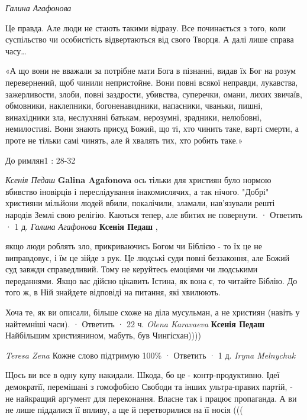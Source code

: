 \begin{itemize}
\emph{Галина Агафонова}

Це правда. Але люди не стають такими відразу. Все починається з того, коли
суспільство чи особистість відвертаються від свого Творця. А далі лише справа
часу…

«А що вони не вважали за потрібне мати Бога в пізнанні, видав їх Бог на розум
перевернений, щоб чинили непристойне. Вони повні всякої неправди, лукавства,
зажерливости, злоби, повні заздрости, убивства, суперечки, омани, лихих
звичаїв, обмовники, наклепники, богоненавидники, напасники, чваньки, пишні,
винахідники зла, неслухняні батькам, нерозумні, зрадники, нелюбовні,
немилостиві. Вони знають присуд Божий, що ті, хто чинить таке, варті смерти, а
проте не тільки самі чинять, але й хвалять тих, хто робить таке.»

До римлян1 : 28-32

\begin{itemize}
\emph{Ксенія Педаш}
\textbf{Galina Agafonova} ось тільки для християн було нормою вбивство
іновірців і переслідування інакомислячих, а так нічого. "Добрі" християни
мільйони людей вбили, покалічили, зламали, нав'язували решті народів Землі свою
релігію. Каються тепер, але вбитих не повернути.
 · Ответить · 1 д.
\emph{Галина Агафонова}
\textbf{Ксенія Педаш} , 

якщо люди роблять зло, прикриваючись Богом чи Біблією - то їх це не
виправдовує, і їм це зійде з рук. Це людські суди повні беззаконня, але Божий
суд завжди справедливий. Тому не керуйтесь емоціями чи людськими переданнями.
Якщо вас дійсно цікавить Істина, як вона є, то читайте Біблію. До того ж, в Ній
знайдете відповіді на питання, які хвилюють.

Хоча те, як ви описали, більше схоже на діла мусульман, а не християн (навіть у найтемніші часи).
 · Ответить · 22 ч.
\emph{Olena Karavaeva}
\textbf{Ксенія Педаш} Найбільшим християнином, мабуть, був Чингісхан))))
\end{itemize}

\emph{Teresa Zena}
Кожне слово підтримую 100\%
 · Ответить · 1 д.
\emph{Iryna Melnychuk}

Щось ви все в одну купу накидали. Шкода, бо це - контр-продуктивно. Ідеї
демократії, перемішані з гомофобією Свободи та інших ультра-правих партій, - не
найкращий аргумент для переконання. Власне так і працює пропаганда. А ви не
лише піддалися її впливу, а ще й перетворилися на її носія (((


\end{itemize}
